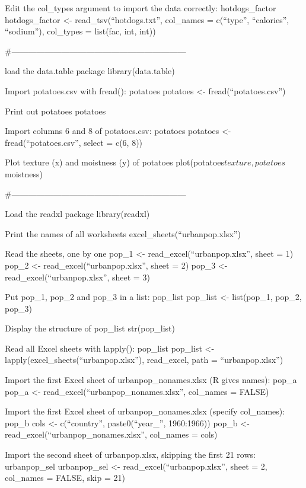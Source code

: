 \documentclass[]{book}
\begin{document}
Edit the col\_types argument to import the data correctly: hotdogs\_factor
hotdogs\_factor \textless{}- read\_tsv(``hotdogs.txt'',
col\_names = c(``type'', ``calories'', ``sodium''),
col\_types = list(fac, int, int))

\#---------------------------------------------------------------

load the data.table package
library(data.table)

Import potatoes.csv with fread(): potatoes
potatoes \textless{}- fread(``potatoes.csv'')

Print out potatoes
potatoes

Import columns 6 and 8 of potatoes.csv: potatoes
potatoes \textless{}- fread(``potatoes.csv'', select = c(6, 8))

Plot texture (x) and moistness (y) of potatoes
plot(potatoes\(texture, potatoes\)moistness)

\#---------------------------------------------------------------

Load the readxl package
library(readxl)

Print the names of all worksheets
excel\_sheets(``urbanpop.xlsx'')

Read the sheets, one by one
pop\_1 \textless{}- read\_excel(``urbanpop.xlsx'', sheet = 1)
pop\_2 \textless{}- read\_excel(``urbanpop.xlsx'', sheet = 2)
pop\_3 \textless{}- read\_excel(``urbanpop.xlsx'', sheet = 3)

Put pop\_1, pop\_2 and pop\_3 in a list: pop\_list
pop\_list \textless{}- list(pop\_1, pop\_2, pop\_3)

Display the structure of pop\_list
str(pop\_list)

Read all Excel sheets with lapply(): pop\_list
pop\_list \textless{}- lapply(excel\_sheets(``urbanpop.xlsx''), read\_excel, path = ``urbanpop.xlsx'')

Import the first Excel sheet of urbanpop\_nonames.xlsx (R gives names): pop\_a
pop\_a \textless{}- read\_excel(``urbanpop\_nonames.xlsx'', col\_names = FALSE)

Import the first Excel sheet of urbanpop\_nonames.xlsx (specify col\_names): pop\_b
cols \textless{}- c(``country'', paste0(``year\_'', 1960:1966))
pop\_b \textless{}- read\_excel(``urbanpop\_nonames.xlsx'', col\_names = cols)

Import the second sheet of urbanpop.xlsx, skipping the first 21 rows: urbanpop\_sel
urbanpop\_sel \textless{}- read\_excel(``urbanpop.xlsx'', sheet = 2, col\_names = FALSE, skip = 21)
\end{document}
